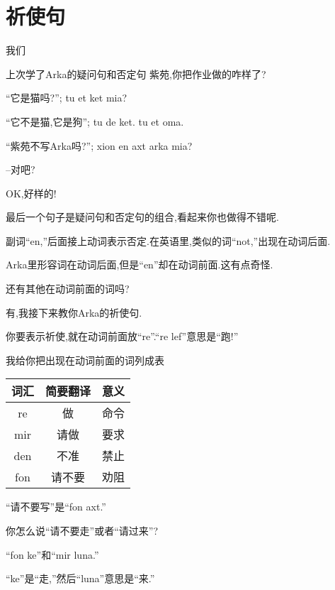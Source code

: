 \chapter[祈使句]{祈使句}

 
\hypertarget{chapter-imperative}{我们}上次学了Arka的疑问句和否定句
紫苑,你把作业做的咋样了?


``它是猫吗?''; tu et ket mia?

``它不是猫,它是狗''; tu de ket. tu et oma.

``紫苑不写Arka吗?''; xion en axt arka mia?

--对吧?


OK,好样的!

最后一个句子是疑问句和否定句的组合,看起来你也做得不错呢.


副词``en,''后面接上动词表示否定.在英语里,类似的词``not,''出现在动词后面.

Arka里形容词在动词后面,但是``en''却在动词前面.这有点奇怪.

还有其他在动词前面的词吗?


有,我接下来教你Arka的祈使句.

你要表示祈使,就在动词前面放``re''.``re lef''意思是``跑!''

我给你把出现在动词前面的词列成表
\begin{table}
    \begin{tabular}{|c|c|c|} %
      \hline
	  \textbf{词汇} & \textbf{简要翻译} & \textbf{意义}\\
      \hline
      re&  做&  命令\\\hline
  mir&  请做&  要求\\\hline
  den&  不准&  禁止\\\hline
  fon&  请不要&  劝阻\\\hline
    \end{tabular}
\end{table}

``请不要写''是``fon axt.''

你怎么说``请不要走''或者``请过来''?


``fon ke''和``mir luna.''

``ke''是``走,''然后``luna''意思是``来.''


